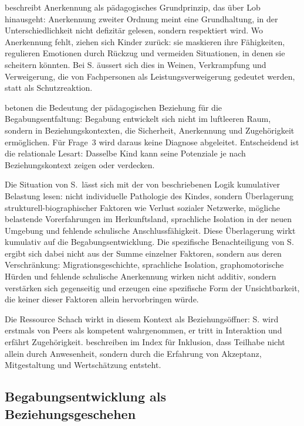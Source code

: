 \documentclass[ngerman, a4paper]{article}
\begin{document}
\textcite[S.\,89\psq]{grossrieder2010anerkennung} beschreibt
Anerkennung als pädagogisches Grundprinzip, das über Lob
hinausgeht: Anerkennung zweiter Ordnung meint eine Grundhaltung,
in der Unterschiedlichkeit
nicht defizitär gelesen, sondern respektiert wird.
Wo Anerkennung fehlt, ziehen sich Kinder zurück: sie maskieren ihre Fähigkeiten,
regulieren Emotionen durch Rückzug und vermeiden Situationen, in denen sie scheitern
könnten. Bei S. äussert sich dies in Weinen, Verkrampfung und Verweigerung, die von
Fachpersonen als Leistungsverweigerung gedeutet werden, statt als Schutzreaktion.

\textcite[S.\,35,\,38]{kuhl2019diversitaet} betonen die Bedeutung der
pädagogischen Beziehung für die
Begabungsentfaltung: Begabung entwickelt sich nicht im luftleeren Raum, sondern in
Beziehungskontexten, die Sicherheit, Anerkennung und Zugehörigkeit
ermöglichen. Für Frage~3 wird daraus keine Diagnose abgeleitet. Entscheidend
ist die relationale Lesart: Dasselbe Kind kann seine Potenziale
je nach Beziehungskontext zeigen oder verdecken.

Die Situation von S.\ lässt sich mit der von
\textcite[S.\,86--98]{behrensen2019inklusive} beschriebenen Logik
kumulativer Belastung lesen: nicht individuelle Pathologie des Kindes, sondern Überlagerung
strukturell-biographischer Faktoren wie Verlust sozialer Netzwerke, mögliche
belastende Vorerfahrungen im Herkunftsland, sprachliche Isolation in der
neuen Umgebung und fehlende schulische Anschlussfähigkeit. Diese
Überlagerung wirkt kumulativ auf die Begabungsentwicklung.
Die spezifische Benachteiligung von S. ergibt sich dabei nicht aus der Summe
einzelner Faktoren, sondern aus deren Verschränkung: Migrationsgeschichte,
sprachliche Isolation, graphomotorische Hürden und fehlende schulische
Anerkennung wirken nicht additiv, sondern verstärken sich gegenseitig
und erzeugen eine spezifische Form der Unsichtbarkeit, die keiner dieser
Faktoren allein hervorbringen würde.

Die Ressource Schach wirkt in diesem Kontext als Beziehungsöffner: S. wird erstmals
von Peers als kompetent wahrgenommen, er tritt in Interaktion und erfährt Zugehörigkeit.
\textcite[S.\,101--125]{booth2019index} beschreiben im Index für Inklusion,
dass Teilhabe nicht allein durch
Anwesenheit, sondern durch die Erfahrung von Akzeptanz, Mitgestaltung und
Wertschätzung entsteht.

\subsection{Begabungsentwicklung als Beziehungsgeschehen}
\end{document}
